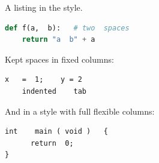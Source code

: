 \documentclass{article}
\begin{document}
A listing in the style.
\begin{lstlisting}[language=Python]
def f(a,  b):   # two  spaces
	return "a  b" + a
\end{lstlisting}
Kept spaces in fixed columns:
\begin{lstlisting}[keepspaces=true, numbers=none]
x   =  1;    y = 2
    indented	tab
\end{lstlisting}
And in a style with full flexible columns:
\begin{lstlisting}[style=kept, frame=none]
int    main ( void )   {
	  return  0;
}
\end{lstlisting}
\end{document}
